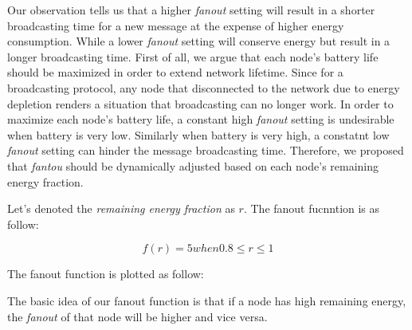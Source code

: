 Our observation tells us that a higher \emph{fanout} setting will result in a shorter broadcasting time for a new message at the expense of higher energy consumption. While a lower \emph{fanout} setting will conserve energy but result in a longer broadcasting time. First of all, we argue that each node's battery life should be maximized in order to extend network lifetime. Since for a broadcasting protocol, any node that disconnected to the network due to energy depletion renders a situation that broadcasting can no longer work. In order to maximize each node's battery life, a constant high \emph{fanout} setting is undesirable when battery is very low. Similarly when battery is very high, a constatnt low \emph{fanout} setting can hinder the message broadcasting time. Therefore, we proposed that \emph{fantou} should be dynamically adjusted based on each node's remaining energy fraction. 

Let's denoted the \emph{remaining energy fraction} as $r$. The fanout fucnntion is as follow:

\[ f(r) = 5 when 0.8 \leq r \leq 1\]

The fanout function is plotted as follow:


The basic idea of our fanout function is that if a node has high remaining energy, the \emph{fanout} of that node will be higher and vice versa. 



